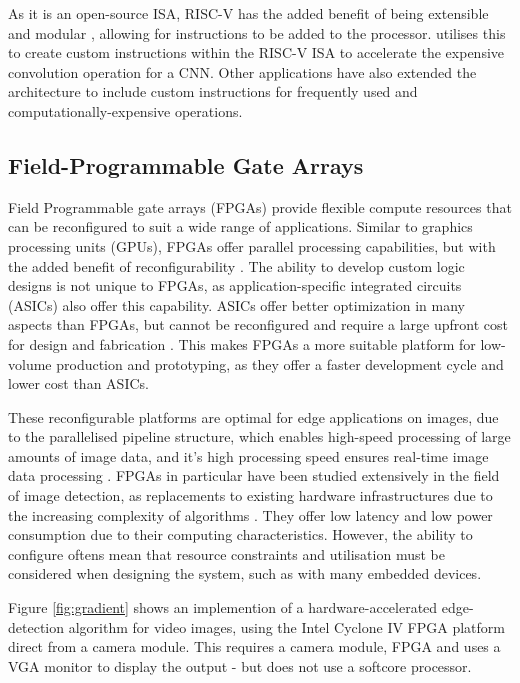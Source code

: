 As it is an open-source ISA, RISC-V has the added benefit of being extensible and modular \cite{Cryptography}, allowing for instructions to be added to the processor.
\cite{Reconfigurable} utilises this to create custom instructions within the RISC-V ISA to accelerate the expensive convolution operation for a CNN.
Other applications have also extended the architecture to include custom instructions for frequently used and computationally-expensive operations.

\subsection{Field-Programmable Gate Arrays}
Field Programmable gate arrays (FPGAs) provide flexible compute resources that can be reconfigured to suit a wide range of applications.
Similar to graphics processing units (GPUs), FPGAs offer parallel processing capabilities, but with the added benefit of reconfigurability \cite{Parallelism}.
The ability to develop custom logic designs is not unique to FPGAs, as application-specific integrated circuits (ASICs) also offer this capability.
ASICs offer better optimization in many aspects than FPGAs, but cannot be reconfigured and require a large upfront cost for design and fabrication \cite{AsicOptimization}.
This makes FPGAs a more suitable platform for low-volume production and prototyping, as they offer a faster development cycle and lower cost than ASICs.

These reconfigurable platforms are optimal for edge applications on images, due to the parallelised pipeline structure, which enables high-speed processing of large amounts of image data, and it's high processing speed ensures real-time image data processing \cite{Video}.
FPGAs in particular have been studied extensively in the field of image detection, as replacements to existing hardware infrastructures due to the increasing complexity of algorithms \cite{ResearchFPGA}.
They offer low latency and low power consumption due to their computing characteristics.
However, the ability to configure oftens mean that resource constraints and utilisation must be considered when designing the system, such as with many embedded devices.


Figure \ref{fig:gradient} shows an implemention of a hardware-accelerated edge-detection algorithm for video images, using the Intel Cyclone IV FPGA platform direct from a camera module. 
This requires a camera module, FPGA and uses a VGA monitor to display the output - but does not use a softcore processor. 

